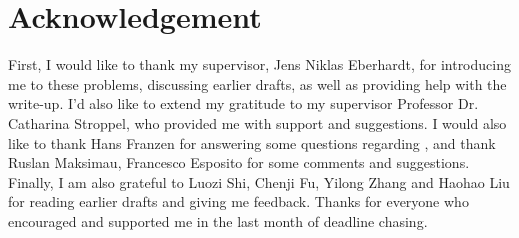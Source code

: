 \section*{Acknowledgement}
First, I would like to thank my supervisor, Jens Niklas Eberhardt, for introducing me to these problems, discussing earlier drafts, as well as providing help with the write-up.  I’d also like to extend my gratitude to my supervisor Professor Dr. Catharina Stroppel, who provided me with support and suggestions. I would also like to thank Hans Franzen for answering some questions regarding \cite{irelli2019cell}, and thank Ruslan Maksimau, Francesco Esposito for some comments and suggestions. Finally, I am also grateful to Luozi Shi, Chenji Fu, Yilong Zhang and Haohao Liu for reading earlier drafts and giving me feedback. Thanks for everyone who encouraged and supported me in the last month of deadline chasing.
